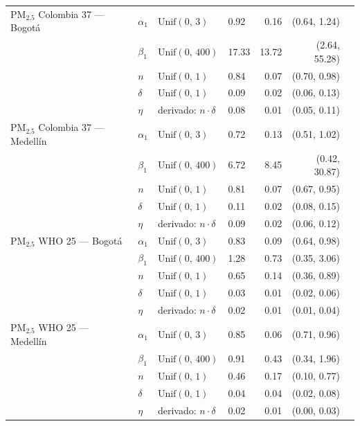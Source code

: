 \begin{longtable}{llllrrr}
PM$_{2.5}$ Colombia 37 --- Bogot\'{a} & $\alpha_{1}$ & $\text{Unif}(0,\,3)$ & 0.92 & 0.16 & (0.64, 1.24) \\
 & $\beta_{1}$ & $\text{Unif}(0,\,400)$ & 17.33 & 13.72 & (2.64, 55.28) \\
 & $n$ & $\text{Unif}(0,\,1)$ & 0.84 & 0.07 & (0.70, 0.98) \\
 & $\delta$ & $\text{Unif}(0,\,1)$ & 0.09 & 0.02 & (0.06, 0.13) \\
 & $\eta$ & derivado: $n \cdot \delta$ & 0.08 & 0.01 & (0.05, 0.11) \\
\midrule
PM$_{2.5}$ Colombia 37 --- Medell\'{i}n & $\alpha_{1}$ & $\text{Unif}(0,\,3)$ & 0.72 & 0.13 & (0.51, 1.02) \\
 & $\beta_{1}$ & $\text{Unif}(0,\,400)$ & 6.72 & 8.45 & (0.42, 30.87) \\
 & $n$ & $\text{Unif}(0,\,1)$ & 0.81 & 0.07 & (0.67, 0.95) \\
 & $\delta$ & $\text{Unif}(0,\,1)$ & 0.11 & 0.02 & (0.08, 0.15) \\
 & $\eta$ & derivado: $n \cdot \delta$ & 0.09 & 0.02 & (0.06, 0.12) \\
\midrule
PM$_{2.5}$ WHO 25 --- Bogot\'{a} & $\alpha_{1}$ & $\text{Unif}(0,\,3)$ & 0.83 & 0.09 & (0.64, 0.98) \\
 & $\beta_{1}$ & $\text{Unif}(0,\,400)$ & 1.28 & 0.73 & (0.35, 3.06) \\
 & $n$ & $\text{Unif}(0,\,1)$ & 0.65 & 0.14 & (0.36, 0.89) \\
 & $\delta$ & $\text{Unif}(0,\,1)$ & 0.03 & 0.01 & (0.02, 0.06) \\
 & $\eta$ & derivado: $n \cdot \delta$ & 0.02 & 0.01 & (0.01, 0.04) \\
\midrule
PM$_{2.5}$ WHO 25 --- Medell\'{i}n & $\alpha_{1}$ & $\text{Unif}(0,\,3)$ & 0.85 & 0.06 & (0.71, 0.96) \\
 & $\beta_{1}$ & $\text{Unif}(0,\,400)$ & 0.91 & 0.43 & (0.34, 1.96) \\
 & $n$ & $\text{Unif}(0,\,1)$ & 0.46 & 0.17 & (0.10, 0.77) \\
 & $\delta$ & $\text{Unif}(0,\,1)$ & 0.04 & 0.04 & (0.02, 0.08) \\
 & $\eta$ & derivado: $n \cdot \delta$ & 0.02 & 0.01 & (0.00, 0.03) \\
\end{longtable}
